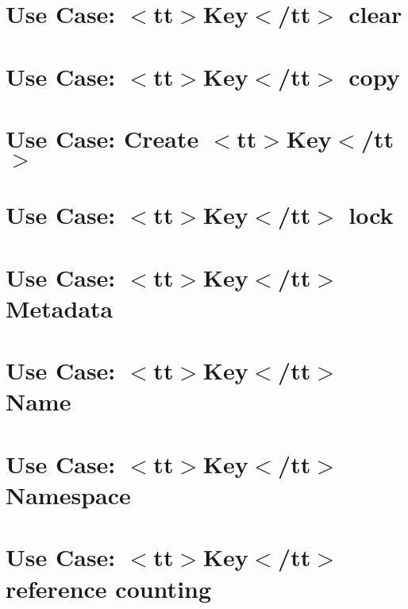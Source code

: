 \let\mypdfximage\pdfximage\def\pdfximage{\immediate\mypdfximage}\documentclass[twoside]{book}
\newcommand{\+}{\discretionary{\mbox{\scriptsize$\hookleftarrow$}}{}{}}
\begin{document}
\chapter{Use Case\+: $<$tt$>$Key$<$/tt$>$ clear}
\label{doc_usecases_core_UC_key_clear_md}

\chapter{Use Case\+: $<$tt$>$Key$<$/tt$>$ copy}
\label{doc_usecases_core_UC_key_copy_md}

\chapter{Use Case\+: Create $<$tt$>$Key$<$/tt$>$}
\label{doc_usecases_core_UC_key_create_md}

\chapter{Use Case\+: $<$tt$>$Key$<$/tt$>$ lock}
\label{doc_usecases_core_UC_key_lock_md}

\chapter{Use Case\+: $<$tt$>$Key$<$/tt$>$ Metadata}
\label{doc_usecases_core_UC_key_meta_md}

\chapter{Use Case\+: $<$tt$>$Key$<$/tt$>$ Name}
\label{doc_usecases_core_UC_key_name_md}

\chapter{Use Case\+: $<$tt$>$Key$<$/tt$>$ Namespace}
\label{doc_usecases_core_UC_key_namespace_md}

\chapter{Use Case\+: $<$tt$>$Key$<$/tt$>$ reference counting}
\label{doc_usecases_core_UC_key_ref_md}

\end{document}
